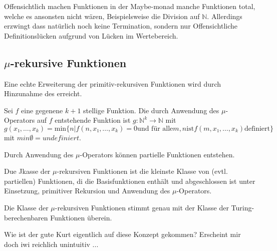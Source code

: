 \documentclass{scrartcl}
\begin{document}
\begin{theorem}
\begin{theorem}
\begin{poof}
\begin{theorem}
\begin{remark}
\begin{remark}
\begin{remark}
\begin{remark}
Offensichtlich machen Funktionen in der Maybe-monad manche Funktionen total,
welche es ansonsten nicht wären, Beispielsweise die Division auf $ℕ$.
Allerdings erzwingt dass natürlich noch keine Termination, sondern nur 
Offensichtliche Definitionslücken aufgrund von Lücken im Wertebereich.
\end{remark}


\subsection{$μ$-rekursive Funktionen}

Eine echte Erweiterung der primitiv-rekursiven Funktionen wird durch
Hinzunahme des  erreicht.

\begin{definition}
Sei $f$ eine gegenene $k + 1$ stellige Funktion.
Die durch Anwendung des $μ$-Operators auf $f$ entstehende Funktion ist 
$g : ℕ^k → ℕ$ mit
$ g(x₁,\dots,x_k) = 
	\text{min} \{ n | f(n,x₁,\dots,x_k) = 0 
	\text{und für alle} m , n \text{ist} f(m,x₁,\dots,x_k) \text{definiert}\}$
mit $min ∅ = undefiniert$.
\end{definition}

\begin{remark}
Durch Anwendung des $μ$-Operators können partielle Funktionen entstehen.
\end{remark}

\begin{definition}
Due Jkasse der $μ$-rekursiven Funktionen ist die kleinste Klasse von
(evtl. partiellen) Funktionen, di die Basisfunktionen enthält und 
abgeschlossen ist unter Einsetzung, primitiver Rekursion und 
Anwendung des $μ$-Operators.
\end{definition}

\begin{theorem}
Die Klasse der $μ$-rekursiven Funktionen stimmt genau mit der Klasse 
der Turing-berechenbaren Funktionen überein.
\end{theorem}

\begin{question}
Wie ist der gute Kurt eigentlich auf diese Konzept gekommen?
Erscheint mir doch iwi reichlich unintuitiv ...
\end{question}




\end{remark}
\end{remark}
\end{remark}
\end{theorem}
\end{poof}
\end{theorem}
\end{theorem}
\end{document}
